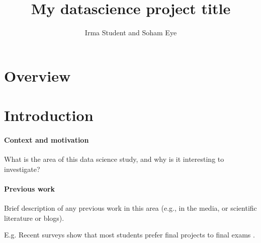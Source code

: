 \documentclass[11pt,a4paper]{article}
\title{My datascience project title}
\author{Irma Student and Soham Eye}
\begin{document}
\maketitle


\section{Overview}

\section{Introduction}

\paragraph{Context and motivation}

What is the area of this data science study, and why is it interesting
to investigate?

\paragraph{Previous work}

Brief description of any previous work in this area (e.g., in the
media, or scientific literature or blogs).

E.g. Recent surveys show that most students prefer final projects to
final exams \cite{Space2021}. 
\end{document}
